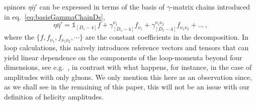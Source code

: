 spinors $\eta \bar \eta'$ can  be expressed in terms of the 
basis of $\gamma$-matrix chains introduced in 
eq.~\eqref{eq:basisGammaChainDs},
%
\begin{equation}\label{eq:etaetaP}
\eta \bar \eta' = \mathbb{1}_{[D_s-4]} f +  
\gamma_{[D_s-4]}^{\nu_1} f_{\nu_1} + 
\gamma_{[D_s-4]}^{\nu_1\nu_2} f_{\nu_1\nu_2} + \ldots \,,
\end{equation}
%
where the $\{ f , f_{\nu_1}, f_{\nu_1\nu_2},\cdots \}$ are the
constant coefficients in the decomposition.
In loop calculations, this naively introduces reference vectors and tensors that can yield linear
dependence on the components of the loop-momenta beyond four
dimensions, see e.g.\ \cite{Badger:2017gta,Anger:2018ove},
in contrast with
what happens, for instance, in the case of amplitudes with
only gluons.
We only mention this here as an observation since, as we 
shall see in the remaining of this paper, this will not be an
issue with our definition of helicity amplitudes.

